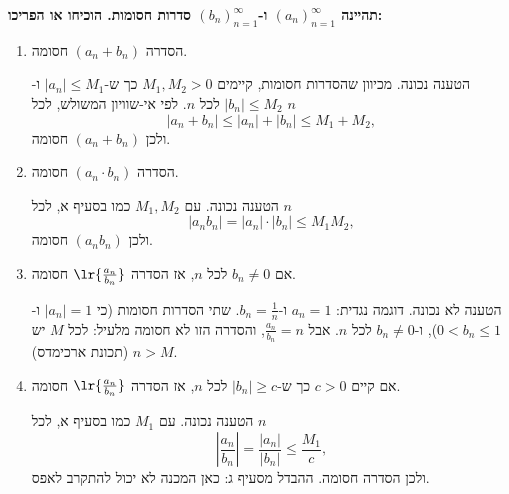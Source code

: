 \textbf{תהיינה
$(a_n)_{n=1}^{\infty}$
ו-$(b_n)_{n=1}^{\infty}$
סדרות חסומות. הוכיחו או הפריכו:}
\begin{enumerate}
\item
הסדרה
$(a_n+b_n)$
חסומה.
\begin{solbox}
הטענה נכונה. מכיוון שהסדרות חסומות, קיימים
$M_1,M_2>0$
כך ש-$|a_n|\le M_1$ ו-$|b_n|\le M_2$ לכל $n$.
לפי אי-שוויון המשולש, לכל $n$
$$|a_n+b_n|\le|a_n|+|b_n|\le M_1+M_2 ,$$
ולכן
$(a_n+b_n)$
חסומה.
\end{solbox}
\item
הסדרה
$(a_n\cdot b_n)$
חסומה.
\begin{solbox}
הטענה נכונה. עם $M_1,M_2$ כמו בסעיף א, לכל $n$
$$|a_nb_n|=|a_n|\cdot|b_n|\le M_1M_2 ,$$
ולכן
$(a_nb_n)$
חסומה.
\end{solbox}
\item
אם
$b_n\neq0$
לכל $n$, אז הסדרה
$\lr{\frac{a_n}{b_n}}$
חסומה.
\begin{solbox}
הטענה לא נכונה. דוגמה נגדית:
$a_n=1$ ו-$b_n=\frac1n$.
שתי הסדרות חסומות (כי $|a_n|=1$ ו-$0<b_n\le1$), ו-$b_n\neq0$ לכל $n$.
אבל
$\frac{a_n}{b_n}=n$,
והסדרה הזו לא חסומה מלעיל: לכל $M$ יש $n>M$ (תכונת ארכימדס).
\end{solbox}
\item
אם קיים
$c>0$
כך ש-$|b_n|\ge c$
לכל $n$, אז הסדרה
$\lr{\frac{a_n}{b_n}}$
חסומה.
\begin{solbox}
הטענה נכונה. עם $M_1$ כמו בסעיף א, לכל $n$
$$\left|\frac{a_n}{b_n}\right|=\frac{|a_n|}{|b_n|}\le\frac{M_1}{c} ,$$
ולכן הסדרה חסומה. ההבדל מסעיף ג: כאן המכנה לא יכול להתקרב לאפס.
\end{solbox}
\end{enumerate}
